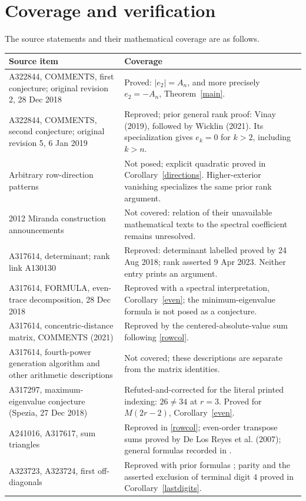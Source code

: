 \documentclass[11pt]{article}
\begin{document}
\section{Coverage and verification}
The source statements and their mathematical coverage are as follows.
{\small
\begin{longtable}{@{}p{.43\linewidth}p{.52\linewidth}@{}}
\toprule
Source item&Coverage\\\midrule
\endhead
A322844, COMMENTS, first conjecture; original revision 2, 28 Dec 2018&Proved: $|e_2|=A_n$, and more precisely $e_2=-A_n$, Theorem~\ref{main}.\\
A322844, COMMENTS, second conjecture; original revision 5, 6 Jan 2019&Reproved; prior general rank proof: Vinay (2019), followed by Wicklin (2021). Its specialization gives $e_k=0$ for $k>2$, including $k>n$.\\
Arbitrary row-direction patterns&Not posed; explicit quadratic proved in Corollary~\ref{directions}. Higher-exterior vanishing specializes the same prior rank argument.\\
2012 Miranda construction announcements&Not covered: relation of their unavailable mathematical texts to the spectral coefficient remains unresolved.\\
A317614, determinant; rank link A130130&Reproved: determinant labelled proved by 24 Aug 2018; rank asserted 9 Apr 2023. Neither entry prints an argument.\\
A317614, FORMULA, even-trace decomposition, 28 Dec 2018&Reproved with a spectral interpretation, Corollary~\ref{even}; the minimum-eigenvalue formula is not posed as a conjecture.\\
A317614, concentric-distance matrix, COMMENTS (2021)&Reproved by the centered-absolute-value sum following \eqref{rowcol}.\\
A317614, fourth-power generation algorithm and other arithmetic descriptions&Not covered; these descriptions are separate from the matrix identities.\\
A317297, maximum-eigenvalue conjecture (Spezia, 27 Dec 2018)&Refuted-and-corrected for the literal printed indexing: $26\ne34$ at $r=3$. Proved for $M(2r-2)$, Corollary~\ref{even}.\\
A241016, A317617, sum triangles&Reproved in \eqref{rowcol}; even-order transpose sums proved by De Los Reyes et al. (2007); general formulas recorded in \cite{sums}.\\
A323723, A323724, first off-diagonals&Reproved with prior formulas \cite{diagonals}; parity and the asserted exclusion of terminal digit $4$ proved in Corollary~\ref{lastdigits}.\\

\end{longtable}}
\end{document}
